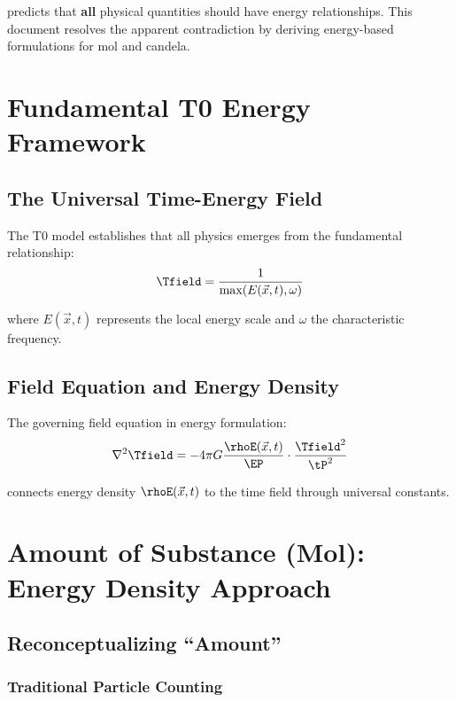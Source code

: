 	predicts that \textbf{all} physical quantities should have energy relationships. This document resolves the apparent contradiction by deriving energy-based formulations for mol and candela.
	
	\section{Fundamental T0 Energy Framework}
	\label{sec:t0_framework}
	
	\subsection{The Universal Time-Energy Field}
	\label{subsec:universal_time_energy}
	
	The T0 model establishes that all physics emerges from the fundamental relationship:
	\begin{equation}
		\Tfield = \frac{1}{\max(E(\vec{x},t), \omega)}
		\label{eq:t0_time_field}
	\end{equation}
	
	where $E(\vec{x},t)$ represents the local energy scale and $\omega$ the characteristic frequency.
	
	\subsection{Field Equation and Energy Density}
	\label{subsec:field_equation}
	
	The governing field equation in energy formulation:
	\begin{equation}
		\nabla^2 \Tfield = -4\pi G \frac{\rhoE(\vec{x},t)}{\EP} \cdot \frac{\Tfield^2}{\tP^2}
		\label{eq:t0_field_equation}
	\end{equation}
	
	connects energy density $\rhoE(\vec{x},t)$ to the time field through universal constants.
	
	\section{Amount of Substance (Mol): Energy Density Approach}
	\label{sec:mol_derivation}
	
	\subsection{Reconceptualizing ``Amount''}
	\label{subsec:reconceptualizing_amount}
	
	\subsubsection{Traditional Particle Counting}
	\label{subsubsec:traditional_counting}
	
